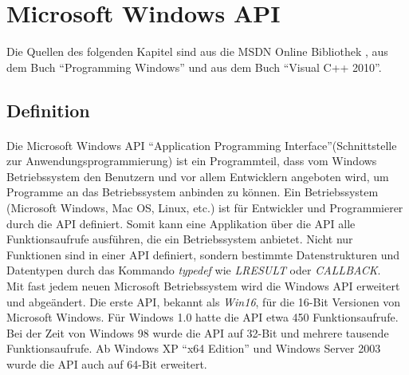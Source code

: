 \newpage





\section{Microsoft Windows API}

Die Quellen des folgenden Kapitel sind aus die MSDN Online Bibliothek \cite{SerialCommunications}, aus dem Buch "`Programming Windows"' \cite{ProgrammingWindows} und aus dem Buch "`Visual C++ 2010"'\cite{VisualC++}.

\subsection{Definition}

\paragraph{}
Die Microsoft Windows API "`Application Programming Interface"'(Schnittstelle zur Anwendungsprogrammierung) ist ein Programmteil, dass vom Windows Betriebssystem den Benutzern und vor allem Entwicklern angeboten wird, um Programme an das Betriebssystem anbinden zu können. Ein Betriebssystem (Microsoft Windows, Mac OS, Linux, etc.) ist für Entwickler und Programmierer durch die API definiert. Somit kann eine Applikation über die API alle Funktionsaufrufe ausführen, die ein Betriebssystem anbietet. Nicht nur Funktionen sind in einer API definiert, sondern bestimmte Datenstrukturen und Datentypen durch das Kommando \textit{typedef} wie \textit{LRESULT} oder \textit{CALLBACK}.
\\

Mit fast jedem neuen Microsoft Betriebssystem wird die Windows API erweitert und abgeändert. Die erste API, bekannt als \textit{Win16}, für die 16-Bit Versionen von Microsoft Windows. Für Windows 1.0 hatte die API etwa 450 Funktionsaufrufe. Bei der Zeit von Windows 98 wurde die API auf 32-Bit und mehrere tausende Funktionsaufrufe. Ab Windows XP "`x64 Edition"' und Windows Server 2003 wurde die API auch auf 64-Bit erweitert.
\\

